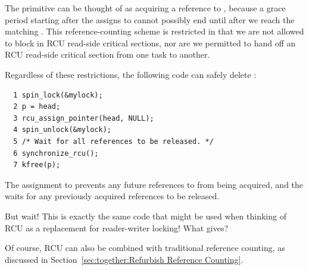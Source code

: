 The  primitive can be thought of as
acquiring a reference to , because a grace period
starting after the  assigns to 
cannot possibly end until after we reach the matching
.
This reference-counting scheme is restricted in that
we are not allowed to block in RCU read-side critical sections,
nor are we permitted to hand off an RCU read-side critical section
from one task to another.

Regardless of these restrictions,
the following code can safely delete :

\vspace{5pt}
\begin{minipage}[t]{\columnwidth}
\scriptsize
\begin{verbatim}
  1 spin_lock(&mylock);
  2 p = head;
  3 rcu_assign_pointer(head, NULL);
  4 spin_unlock(&mylock);
  5 /* Wait for all references to be released. */
  6 synchronize_rcu();
  7 kfree(p);
\end{verbatim}
\end{minipage}
\vspace{5pt}

The assignment to  prevents any future references
to  from being acquired, and the 
waits for any previously acquired references to be released.

\QuickQuiz{}
	But wait!
	This is exactly the same code that might be used when thinking
	of RCU as a replacement for reader-writer locking!
	What gives?
 \QuickQuizEnd

Of course, RCU can also be combined with traditional reference counting,
as discussed in
Section~\ref{sec:together:Refurbish Reference Counting}.

